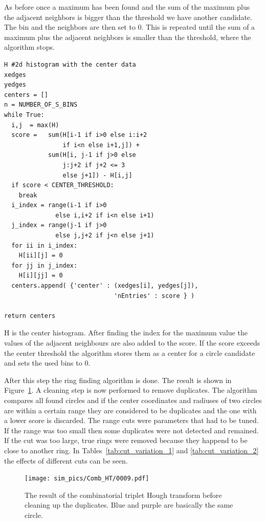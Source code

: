 \documentclass[11pt]{scrreprt}
\begin{document}
As before once a maximum has been found and the sum of the maximum plus the adjacent neighbors is bigger than the threshold we have another
candidate. The bin and the neighbors are then set to 0. This is repeated until the sum of a maximum plus the adjacent neighbors is smaller
than the threshold, where the algorithm stops.
\begin{codesnippet}
  \begin{lstlisting}
H #2d histogram with the center data
xedges 
yedges 
centers = []
n = NUMBER_OF_S_BINS
while True:
  i,j  = max(H)
  score =   sum(H[i-1 if i>0 else i:i+2 
                if i<n else i+1,j]) + 
            sum(H[i, j-1 if j>0 else
                j:j+2 if j+2 <= 3 
                else j+1]) - H[i,j]
  if score < CENTER_THRESHOLD:
    break
  i_index = range(i-1 if i>0 
              else i,i+2 if i<n else i+1)
  j_index = range(j-1 if j>0 
              else j,j+2 if j<n else j+1)
  for ii in i_index:
    H[ii][j] = 0  
  for jj in j_index:
    H[i][jj] = 0
  centers.append( {'center' : (xedges[i], yedges[j]), 
                              'nEntries' : score } )

return centers
\end{lstlisting}
\caption[Center coordinate extraction]{H is the center histogram. After finding the index for the maximum value the values of the 
adjacent neighbours are also added to the score. If the score exceeds the center threshold the algorithm stores them as a center for
a circle candidate and sets the used bins to 0.}
\end{codesnippet}


After this step the ring finding algorithm is done. The result is shown in Figure~\ref{fig:comb_ht_0009}. A cleaning step is now performed
to remove duplicates.
The algorithm compares all found circles and if the center coordinates and radiuses of two circles are within a certain range they 
are considered to be duplicates and the one with a lower score is discarded. The range cuts were parameters that had to be tuned. If the 
range was too small then some duplicates were not detected and remained. If the cut was too large, true rings were removed because they
happend to be close to another ring. In Tables~\ref{tab:cut_variation_1} and \ref{tab:cut_variation_2} the effects of different
cuts can be seen.


\begin{figure}[htb]
  \centering
  \texttt{[image: sim\_pics/Comb\_HT/0009.pdf]}
  \caption{The result of the combinatorial triplet Hough transform before cleaning up the duplicates. Blue and purple are basically the same circle.}
  \label{fig:comb_ht_0009}
\end{figure}
\end{document}
